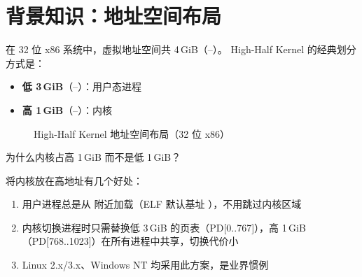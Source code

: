 \section{背景知识：地址空间布局}

在 32 位 x86 系统中，虚拟地址空间共 4\,GiB（--）。
High-Half Kernel 的经典划分方式是：

\begin{itemize}
  \item \textbf{低 3\,GiB}（--）：用户态进程
  \item \textbf{高 1\,GiB}（--）：内核
\end{itemize}

\begin{figure}[H]
  \centering
  
  \caption{High-Half Kernel 地址空间布局（32 位 x86）}
  \label{fig:high-half-layout}
\end{figure}

\begin{whybox}
为什么内核占高 1\,GiB 而不是低 1\,GiB？

将内核放在高地址有几个好处：
\begin{enumerate}
  \item 用户进程总是从  附近加载（ELF 默认基址 ），不用跳过内核区域
  \item 内核切换进程时只需替换低 3\,GiB 的页表（PD[0..767]），高 1\,GiB（PD[768..1023]）在所有进程中共享，切换代价小
  \item Linux 2.x/3.x、Windows NT 均采用此方案，是业界惯例
\end{enumerate}
\end{whybox}


